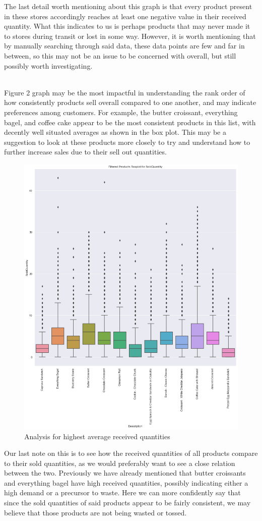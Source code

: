 The last detail worth mentioning about this graph is that every product present in these stores accordingly reaches at least one negative value in their received quantity. What this indicates to us is perhaps products that may never made it to stores during transit or lost in some way. However, it is worth mentioning that by manually searching through said data, these data points are few and far in between, so this may not be an issue to be concerned with overall, but still possibly worth investigating.

\\

Figure 2 graph may be the most impactful in understanding the rank order of how consistently products sell overall compared to one another, and may indicate preferences among customers. For example, the butter croissant, everything bagel, and coffee cake appear to be the most consistent products in this list, with decently well situated averages as shown in the box plot. This may be a suggestion to look at these products more closely to try and understand how to further increase sales due to their sell out quantities. 
\begin{figure}[ht]
    \centering
    \includegraphics[width = 0.7\linewidth]{figures/figure2.png}
    \caption{Analysis for highest average received quantities }
\end{figure}
Our last note on this is to see how the received quantities of all products compare to their sold quantities, as we would preferably want to see a close relation between the two. Previously we have already mentioned that butter croissants and everything bagel have high received quantities, possibly indicating either a high demand or a precursor to waste. Here we can more confidently say that since the sold quantities of said products appear to be fairly consistent, we may believe that those products are not being wasted or tossed.

